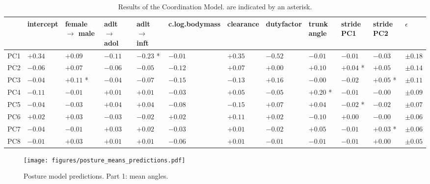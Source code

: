 \begin{landscape}
\begin{table}[b!]
\caption{\label{tab:coordinationresults}Results of the Coordination Model.  are indicated by an asterisk.}
\centering
\scriptsize
\begin{tabular}{llllllllllll}
 & intercept & female \(\rightarrow\) male & adlt \(\rightarrow\) adol & adlt \(\rightarrow\) inft & c.log.bodymass & clearance & dutyfactor & trunk angle & stride PC1 & stride PC2 & \(\epsilon\)\\[0pt]
\hline
PC1 & \(+0.34\) & \(+0.09\) & \(-0.11\) & \(-0.23\) * & \(-0.01\) & \(+0.35\) & \(-0.52\) & \(-0.01\) & \(-0.01\) & \(-0.03\) & \(\pm 0.18\)\\[0pt]
PC2 & \(-0.06\) & \(+0.07\) & \(-0.06\) & \(-0.05\) & \(-0.12\) & \(+0.07\) & \(+0.00\) & \(+0.10\) & \(+0.04\) * & \(+0.05\) & \(\pm 0.14\)\\[0pt]
PC3 & \(-0.04\) & \(+0.11\) * & \(-0.04\) & \(-0.07\) & \(-0.15\) & \(-0.13\) & \(+0.16\) & \(-0.00\) & \(-0.02\) & \(+0.05\) * & \(\pm 0.11\)\\[0pt]
PC4 & \(-0.11\) & \(-0.01\) & \(+0.01\) & \(+0.01\) & \(-0.03\) & \(+0.05\) & \(-0.05\) & \(+0.20\) * & \(-0.01\) & \(-0.00\) & \(\pm 0.09\)\\[0pt]
PC5 & \(-0.04\) & \(-0.03\) & \(+0.04\) & \(+0.04\) & \(-0.08\) & \(-0.15\) & \(+0.07\) & \(+0.04\) & \(-0.02\) * & \(-0.02\) & \(\pm 0.07\)\\[0pt]
PC6 & \(+0.02\) & \(+0.03\) & \(-0.03\) & \(-0.02\) & \(+0.02\) & \(+0.11\) & \(+0.02\) & \(-0.10\) & \(+0.00\) & \(-0.00\) & \(\pm 0.06\)\\[0pt]
PC7 & \(-0.04\) & \(-0.01\) & \(+0.03\) & \(+0.02\) & \(-0.03\) & \(+0.01\) & \(-0.02\) & \(+0.05\) & \(-0.01\) & \(+0.03\) * & \(\pm 0.06\)\\[0pt]
PC8 & \(-0.01\) & \(+0.03\) & \(+0.01\) & \(+0.01\) & \(-0.06\) & \(+0.01\) & \(-0.01\) & \(-0.01\) & \(-0.01\) & \(+0.00\) & \(\pm 0.05\)\\[0pt]
\end{tabular}
\end{table}
\end{landscape}
\clearpage

\begin{figure}[h!]
\centering
\texttt{[image: figures/posture\_means\_predictions.pdf]}
\caption{\label{fig:posture1}Posture model predictions. Part 1: mean  angles.}
\end{figure}

